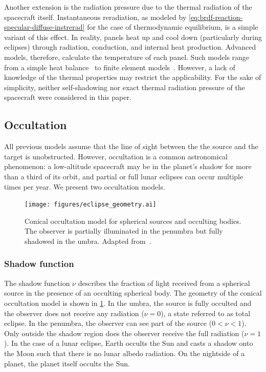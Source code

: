 Another extension is the radiation pressure due to the thermal radiation of the spacecraft itself. Instantaneous reradiation, as modeled by \cref{eq:brdf-reaction-specular-diffuse-instrerad} for the case of thermodynamic equilibrium, is a simple variant of this effect. In reality, panels heat up and cool down (particularly during eclipses) through radiation, conduction, and internal heat production. Advanced models, therefore, calculate the temperature of each panel. Such models range from a simple heat balance~\cite{Wetterer2014} to finite element models~\cite{Woeske2019}. However, a lack of knowledge of the thermal properties may restrict the applicability. For the sake of simplicity, neither self-shadowing nor exact thermal radiation pressure of the spacecraft were considered in this paper.



\subsection{Occultation}
All previous models assume that the line of sight between the the source and the target is unobstructed. However, occultation is a common astronomical phenomenon: a low-altitude spacecraft may be in the planet's shadow for more than a third of its orbit, and partial or full lunar eclipses can occur multiple times per year. We present two occultation models.


\begin{figure}[t]
    \centering
    \texttt{[image: figures/eclipse\_geometry.ai]}
    \caption{Conical occultation model for spherical sources and occulting bodies. The observer is partially illuminated in the penumbra but fully shadowed in the umbra. Adapted from~\cite{Vallado2013}.}
    \label{fig:eclipse-geometry}
\end{figure}

\subsubsection{Shadow function}
The shadow function $\nu$ describes the fraction of light received from a spherical source in the presence of an occulting spherical body. The geometry of the conical occultation model is shown in \cref{fig:eclipse-geometry}. In the umbra, the source is fully occulted and the observer does not receive any radiation ($\nu = 0$), a state referred to as total eclipse. In the penumbra, the observer can see part of the source ($0 < \nu < 1$). Only outside the shadow region does the observer receive the full radiation ($\nu = 1$). In the case of a lunar eclipse, Earth occults the Sun and casts a shadow onto the Moon such that there is no lunar albedo radiation. On the nightside of a planet, the planet itself occults the Sun.

